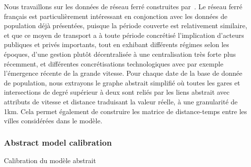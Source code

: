 Nous travaillons sur les données de réseau ferré construites par~\cite{thevenin2013mapping}. Le réseau ferré français est particulièrement intéressant en conjonction avec les données de population déjà présentées, puisque la période couverte est relativement similaire, et que ce moyen de transport a à toute période concrétisé l'implication d'acteurs publiques et privés importants, tout en exhibant différents régimes selon les époques, d'une gestion plutôt décentralisée à une centralisation très forte plus récemment, et différentes concrétisations technologiques avec par exemple l'émergence récente de la grande vitesse. Pour chaque date de la base de donnée de population, nous extrayons le graphe abstrait simplifié où toutes les gares et intersections de degré supérieur à deux sont reliés par les liens abstrait avec attributs de vitesse et distance traduisant la valeur réelle, à une granularité de 1km. Cela permet également de construire les matrice de distance-temps entre les villes considérées dans le modèle.














\subsubsection{Abstract model calibration}{Calibration du modèle abstrait}




